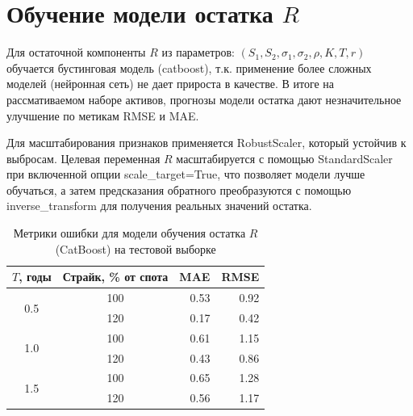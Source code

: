 \section{Обучение модели остатка $R$}
\label{sec:res-residual}
Для остаточной компоненты $R$ из параметров: $(S_{1},S_{2},\sigma_1,\sigma_2,\rho,K,T,r)$ обучается бустинговая модель (catboost), т.к. применение более сложных моделей (нейронная сеть) 
не дает прироста в качестве. В итоге на рассмативаемом наборе активов, прогнозы 
модели остатка дают незначительное улучшение по метикам RMSE и MAE.

Для масштабирования признаков применяется RobustScaler,
 который устойчив к выбросам. 
 Целевая переменная $R$ масштабируется с помощью StandardScaler
  при включенной опции scale\_target=True, 
  что позволяет модели лучше обучаться, 
  а затем предсказания обратного преобразуются 
  с помощью inverse\_transform для получения реальных
   значений остатка.


\begin{table}[H]
\centering
\caption{Метрики ошибки для модели обучения остатка $R$ (CatBoost) на тестовой выборке}
\label{tab:metrics_residual}
\begin{tabular}{ccrr}
\toprule
$T$, годы & Страйк, \% от спота & MAE & RMSE \\
\midrule
\multirow{2}{*}{0.5} & 100 & 0.53 & 0.92 \\
                     & 120 & 0.17 & 0.42 \\
\midrule
\multirow{2}{*}{1.0} & 100 & 0.61 & 1.15 \\
                     & 120 & 0.43 & 0.86 \\
\midrule
\multirow{2}{*}{1.5} & 100 & 0.65 & 1.28 \\
                     & 120 & 0.56 & 1.17 \\

\bottomrule
\end{tabular}
\end{table}


